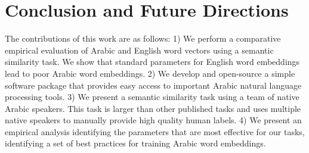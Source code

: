 \section{Conclusion and Future Directions}

The contributions of this work are as follows: 1) We perform a comparative empirical evaluation of Arabic and English word vectors using a semantic similarity task. We show that standard parameters for English word embeddings lead to poor Arabic word embeddings. 2) We develop and open-source a simple software package that provides easy access to important Arabic natural language processing tools. 3) We present a semantic similarity task using a team of native Arabic speakers. This task is larger than other published tasks and uses multiple native speakers to manually provide high quality human labels. 4) We present an empirical analysis identifying the parameters that are most effective for our tasks, identifying a set of best practices for training Arabic word embeddings.

\label{sec:conclusions}
